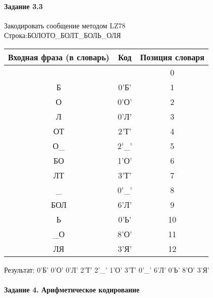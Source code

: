 \documentclass[a4paper, 12pt]{article}
\begin{document}
\paragraph{Задание 3.3}

Закодировать сообщение методом LZ78\\
Строка:БОЛОТО\_БОЛТ\_БОЛЬ\_ОЛЯ\\
\begin{table}[h!]
\centering
\begin{tabular}{|c|c|c|} 
\hline
 Входная фраза (в словарь) & Код & Позиция словаря \\ \hline

 &  & 0 \\ \hline
Б & 0'Б' & 1 \\ \hline
О & 0'О' & 2 \\ \hline
Л & 0'Л' & 3 \\ \hline
ОТ & 2'Т' & 4 \\ \hline
О\_ & 2'\_' & 5 \\ \hline
БО & 1'О' & 6 \\ \hline
ЛТ & 3'Т' & 7 \\ \hline
\_ & 0'\_' & 8 \\ \hline
БОЛ & 6'Л' & 9 \\ \hline
Ь & 0'Ь' & 10 \\ \hline
\_О & 8'О' & 11 \\ \hline
ЛЯ & 3'Я' & 12 \\ \hline
\end{tabular}
\end{table}

Результат: 0'Б' 0'О' 0'Л' 2'Т' 2'\_' 1'О' 3'Т' 0'\_' 6'Л' 0'Ь' 8'О' 3'Я'\\
\pagebreak
\paragraph{Задание 4. Арифметическое кодирование\\}
\end{document}
